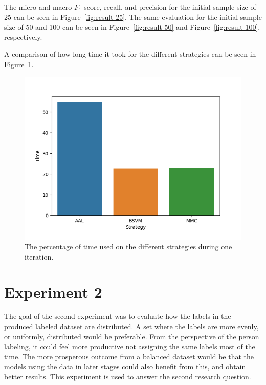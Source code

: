 The micro and macro $F_1$-score, recall, and precision for the initial sample size of 25 can be seen in Figure~\ref{fig:result-25}.
The same evaluation for the initial sample size of 50 and 100 can be seen in Figure~\ref{fig:result-50} and Figure~\ref{fig:result-100}, respectively.


A comparison of how long time it took for the different strategies can be seen in Figure~\ref{fig:al-time-dist}.

\begin{figure}[!ht]
    \centering
    \includegraphics[width=\textwidth]{figures/time-distribution.png}
    \caption{The percentage of time used on the different strategies during one iteration.}
    \label{fig:al-time-dist}
\end{figure}

\section{Experiment 2}

The goal of the second experiment was to evaluate how the labels in the produced labeled dataset are distributed.
A set where the labels are more evenly, or uniformly, distributed would be preferable.
From the perspective of the person labeling, it could feel more productive not assigning the same labels most of the time.
The more prosperous outcome from a balanced dataset would be that the models using the data in later stages could also benefit from this, and obtain better results.
This experiment is used to answer the second research question.

